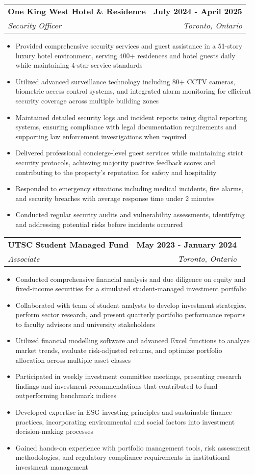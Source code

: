 \documentclass[letterpaper,11pt]{article}
\makeatletter
\newcommand{\resumeItem}[1]{
  \item\small{
    {#1 \vspace{-2pt}}
  }
}
\newcommand{\resumeSubheading}[4]{
  \vspace{-2pt}\item
    \begin{tabular*}{1.0\textwidth}[t]{l@{\extracolsep{\fill}}r}
      \textbf{#1} & \textbf{\small #2} \\
      \textit{\small#3} & \textit{\small #4} \\
    \end{tabular*}\vspace{-7pt}
}
\newcommand{\resumeItemListStart}{\begin{itemize}}
\newcommand{\resumeItemListEnd}{\end{itemize}\vspace{-5pt}}
\makeatother
\begin{document}
    \resumeSubheading
      {One King West Hotel \& Residence}{July 2024 - April 2025}
      {Security Officer}{Toronto, Ontario}
      \resumeItemListStart
        \resumeItem{Provided comprehensive security services and guest assistance in a 51-story luxury hotel environment, serving 400+ residences and hotel guests daily while maintaining 4-star service standards}
        \resumeItem{Utilized advanced surveillance technology including 80+ CCTV cameras, biometric access control systems, and integrated alarm monitoring for efficient security coverage across multiple building zones}
        \resumeItem{Maintained detailed security logs and incident reports using digital reporting systems, ensuring compliance with legal documentation requirements and supporting law enforcement investigations when required}
        \resumeItem{Delivered professional concierge-level guest services while maintaining strict security protocols, achieving majority positive feedback scores and contributing to the property's reputation for safety and hospitality}
        \resumeItem{Responded to emergency situations including medical incidents, fire alarms, and security breaches with average response time under 2 minutes}
        \resumeItem{Conducted regular security audits and vulnerability assessments, identifying and addressing potential risks before incidents occurred}
    \resumeItemListEnd

    \resumeSubheading
      {UTSC Student Managed Fund}{May 2023 - January 2024}
      {Associate}{Toronto, Ontario}
      \resumeItemListStart
        \resumeItem{Conducted comprehensive financial analysis and due diligence on equity and fixed-income securities for a simulated student-managed investment portfolio}
        \resumeItem{Collaborated with team of student analysts to develop investment strategies, perform sector research, and present quarterly portfolio performance reports to faculty advisors and university stakeholders}
        \resumeItem{Utilized financial modelling software and advanced Excel functions to analyze market trends, evaluate risk-adjusted returns, and optimize portfolio allocation across multiple asset classes}
        \resumeItem{Participated in weekly investment committee meetings, presenting research findings and investment recommendations that contributed to fund outperforming benchmark indices}
        \resumeItem{Developed expertise in ESG investing principles and sustainable finance practices, incorporating environmental and social factors into investment decision-making processes}
        \resumeItem{Gained hands-on experience with portfolio management tools, risk assessment methodologies, and regulatory compliance requirements in institutional investment management}
      \resumeItemListEnd
\end{document}
